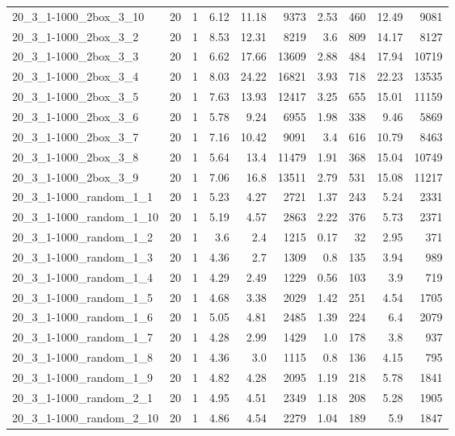 \begin{center}
\begin{scriptsize}
\begin{longtable}{lrrrrrrrrr}
20\_3\_1-1000\_2box\_3\_10 & 20 & 1 & 6.12 & 11.18 & 9373 & 2.53 & 460 & 12.49 & 9081\\
20\_3\_1-1000\_2box\_3\_2 & 20 & 1 & 8.53 & 12.31 & 8219 & 3.6 & 809 & 14.17 & 8127\\
20\_3\_1-1000\_2box\_3\_3 & 20 & 1 & 6.62 & 17.66 & 13609 & 2.88 & 484 & 17.94 & 10719\\
20\_3\_1-1000\_2box\_3\_4 & 20 & 1 & 8.03 & 24.22 & 16821 & 3.93 & 718 & 22.23 & 13535\\
20\_3\_1-1000\_2box\_3\_5 & 20 & 1 & 7.63 & 13.93 & 12417 & 3.25 & 655 & 15.01 & 11159\\
20\_3\_1-1000\_2box\_3\_6 & 20 & 1 & 5.78 & 9.24 & 6955 & 1.98 & 338 & 9.46 & 5869\\
20\_3\_1-1000\_2box\_3\_7 & 20 & 1 & 7.16 & 10.42 & 9091 & 3.4 & 616 & 10.79 & 8463\\
20\_3\_1-1000\_2box\_3\_8 & 20 & 1 & 5.64 & 13.4 & 11479 & 1.91 & 368 & 15.04 & 10749\\
20\_3\_1-1000\_2box\_3\_9 & 20 & 1 & 7.06 & 16.8 & 13511 & 2.79 & 531 & 15.08 & 11217\\
20\_3\_1-1000\_random\_1\_1 & 20 & 1 & 5.23 & 4.27 & 2721 & 1.37 & 243 & 5.24 & 2331\\
20\_3\_1-1000\_random\_1\_10 & 20 & 1 & 5.19 & 4.57 & 2863 & 2.22 & 376 & 5.73 & 2371\\
20\_3\_1-1000\_random\_1\_2 & 20 & 1 & 3.6 & 2.4 & 1215 & 0.17 & 32 & 2.95 & 371\\
20\_3\_1-1000\_random\_1\_3 & 20 & 1 & 4.36 & 2.7 & 1309 & 0.8 & 135 & 3.94 & 989\\
20\_3\_1-1000\_random\_1\_4 & 20 & 1 & 4.29 & 2.49 & 1229 & 0.56 & 103 & 3.9 & 719\\
20\_3\_1-1000\_random\_1\_5 & 20 & 1 & 4.68 & 3.38 & 2029 & 1.42 & 251 & 4.54 & 1705\\
20\_3\_1-1000\_random\_1\_6 & 20 & 1 & 5.05 & 4.81 & 2485 & 1.39 & 224 & 6.4 & 2079\\
20\_3\_1-1000\_random\_1\_7 & 20 & 1 & 4.28 & 2.99 & 1429 & 1.0 & 178 & 3.8 & 937\\
20\_3\_1-1000\_random\_1\_8 & 20 & 1 & 4.36 & 3.0 & 1115 & 0.8 & 136 & 4.15 & 795\\
20\_3\_1-1000\_random\_1\_9 & 20 & 1 & 4.82 & 4.28 & 2095 & 1.19 & 218 & 5.78 & 1841\\
20\_3\_1-1000\_random\_2\_1 & 20 & 1 & 4.95 & 4.51 & 2349 & 1.18 & 208 & 5.28 & 1905\\
20\_3\_1-1000\_random\_2\_10 & 20 & 1 & 4.86 & 4.54 & 2279 & 1.04 & 189 & 5.9 & 1847\\

\end{longtable}
\end{scriptsize}
\end{center}
